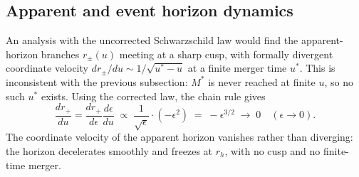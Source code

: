 \documentclass[11pt]{article}
\begin{document}
\subsection{Apparent and event horizon dynamics}
\label{sec:horizons}

An analysis with the uncorrected Schwarzschild law would find the apparent-horizon branches $r_\pm(u)$ meeting at a sharp cusp, with formally divergent coordinate velocity $dr_\pm/du\sim1/\sqrt{u^*-u}$ at a finite merger time $u^*$. This is inconsistent with the previous subsection: $M^*$ is never reached at finite $u$, so no such $u^*$ exists. Using the corrected law, the chain rule gives
\begin{equation}
\frac{dr_+}{du}=\frac{dr_+}{d\epsilon}\frac{d\epsilon}{du}\;\propto\;\frac{1}{\sqrt\epsilon}\cdot(-\epsilon^2)\;=\;-\epsilon^{3/2}\;\longrightarrow\;0\quad(\epsilon\to0).
\label{eq:dr+du}
\end{equation}
The coordinate velocity of the apparent horizon vanishes rather than diverging: the horizon decelerates smoothly and freezes at $r_h$, with no cusp and no finite-time merger.
\end{document}

